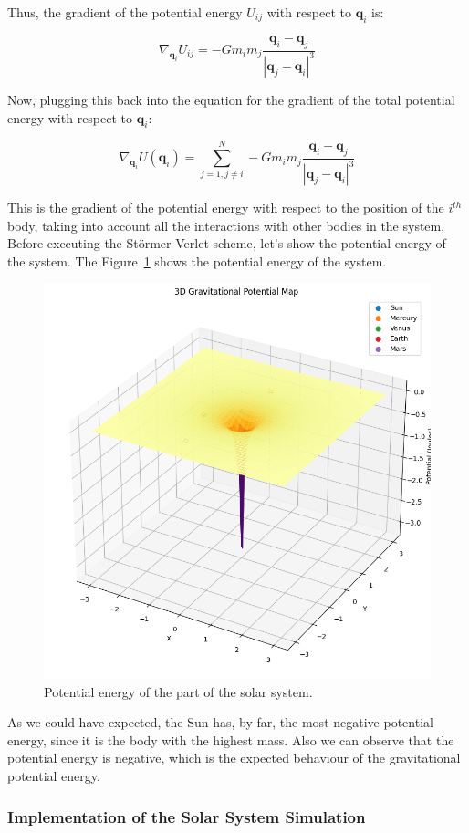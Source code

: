 \documentclass{article}
\begin{document}
Thus, the gradient of the potential energy \(U_{ij}\) with respect to \(\mathbf{q}_i\) is:
		
\[
	\nabla_{\mathbf{q}_i} U_{ij} = - G m_i m_j \frac{\mathbf{q}_i - \mathbf{q}_j}{|\mathbf{q}_j - \mathbf{q}_i|^3}
\]
		
Now, plugging this back into the equation for the gradient of the total potential energy with respect to \(\mathbf{q}_i\):
		
\[
	\nabla_{\mathbf{q}_i} U(\mathbf{q}_i) = \sum_{j=1, j\neq i}^{N} - G m_i m_j \frac{\mathbf{q}_i - \mathbf{q}_j}{|\mathbf{q}_j - \mathbf{q}_i|^3}
\]
		
This is the gradient of the potential energy with respect to the position of the \(i^{th}\) body, taking into account all the interactions with other bodies in the system. Before executing the Störmer-Verlet scheme, let's show the potential energy of the system. The Figure~\ref{fig:potentialenergy} shows the potential energy of the system.

\begin{figure}[H]
	\centering
	\includegraphics[width=0.5\linewidth]{./Figures/SolarSystem/gravitationalpotential.png}
	\caption{Potential energy of the part of the solar system.}
	\label{fig:potentialenergy}
\end{figure}
As we could have expected, the Sun has, by far, the most negative potential energy, since it is the body with the highest mass. Also we can observe that the potential energy is negative, which is the expected behaviour of the gravitational potential energy. 

\subsubsection{Implementation of the Solar System Simulation}
\label{sec:implementation_solar_system}
\end{document}
